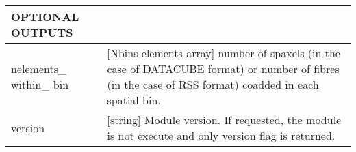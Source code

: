\begin{center}
\begin{longtable}{p{2.7cm}| p{11.1cm} }
%
\hline
{\bf OPTIONAL OUTPUTS} & \\
\hline
%
 nelements\_ within\_ bin & [Nbins elements array] number of spaxels (in the case of DATACUBE format) or number of fibres (in the case of RSS format) coadded in each spatial bin.\\
%
 version   & [string]            Module version. If requested, the module is not execute and only version flag is returned.\\
\hline
\end{longtable}
\end{center}


